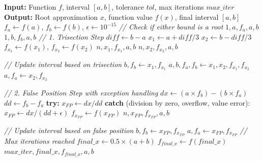 \documentclass[amsmath, amssymb, aps]{revtex4-2}
\begin{document}
    \begin{algorithmic}[1]
    \State \textbf{Input:} Function $f$, interval $[a, b]$, tolerance $tol$, max iterations $max\_iter$
    \State \textbf{Output:} Root approximation $x$, function value $f(x)$, final interval $[a, b]$
    \State $f_a \gets f(a)$, $f_b \gets f(b)$, $\epsilon \gets 10^{-15}$
    \State \textit{// Check if either bound is a root}
        \State \Return $1, a, f_a, a, b$
    \EndIf
        \State \Return $1, b, f_b, a, b$
    \EndIf
        \State \textit{// 1. Trisection Step}
        \State $diff \gets b - a$
        \State $x_1 \gets a + diff/3$
        \State $x_2 \gets b - diff/3$
        \State $f_{x_1} \gets f(x_1)$, $f_{x_2} \gets f(x_2)$
            \State \Return $n, x_1, f_{x_1}, a, b$
        \EndIf
            \State \Return $n, x_2, f_{x_2}, a, b$
        \EndIf
        
        \State \textit{// Update interval based on trisection}
            \State $b, f_b \gets x_1, f_{x_1}$
            \State $a, b, f_a, f_b \gets x_1, x_2, f_{x_1}, f_{x_2}$
        \Else
            \State $a, f_a \gets x_2, f_{x_2}$
        \EndIf
    
        \State \textit{// 2. False Position Step with exception handling}
        \State $dx \gets (a \times f_b) - (b \times f_a)$
        \State $dd \gets f_b - f_a$
        \State \textbf{try:}
        \State \quad $x_{FP} \gets dx / dd$
        \State \textbf{catch} (division by zero, overflow, value error):
        \State \quad $x_{FP} \gets dx / (dd + \epsilon)$
        \State $f_{x_{FP}} \gets f(x_{FP})$
            \State \Return $n, x_{FP}, f_{x_{FP}}, a, b$
        \EndIf
    
        \State \textit{// Update interval based on false position}
            \State $b, f_b \gets x_{FP}, f_{x_{FP}}$
        \Else
            \State $a, f_a \gets x_{FP}, f_{x_{FP}}$
        \EndIf
    \EndFor
    \State \textit{// Max iterations reached}
    \State $final\_x \gets 0.5 \times (a + b)$
    \State $f_{final\_x} \gets f(final\_x)$
    \State \Return $max\_iter, final\_x, f_{final\_x}, a, b$
    \end{algorithmic}
\end{document}
